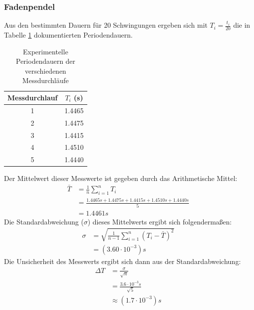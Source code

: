 \documentclass{report}
\begin{document}
\subsubsection{Fadenpendel}
Aus den bestimmten Dauern für 20 Schwingungen ergeben sich mit $T_i = \frac{t_i}{20}$ die in Tabelle \ref{tab:PeriodeMessdurchlaeufe} dokumentierten Periodendauern.
\begin{table}[H]
    \centering
    \caption{Experimentelle Periodendauern der verschiedenen Messdurchläufe}
    \label{tab:PeriodeMessdurchlaeufe}
    \begin{tabular}{c | c}
        \hline
        Messdurchlauf & $T_i$ (s) \\
        \hline
        1 & 1.4465\\
        2 & 1.4475\\
        3 & 1.4415\\
        4 & 1.4510\\
        5 & 1.4440\\
    \end{tabular}
\end{table}
\noindent
Der Mittelwert dieser Messwerte ist gegeben durch das Arithmetische Mittel:
\begin{equation}
    \begin{split}
        \bar{T} &= \frac{1}{n} \sum_{i=1}^{n} T_i \\
                &= \frac{1.4465s + 1.4475s + 1.4415s + 1.4510s + 1.4440s}{5} \\
                &= 1.4461s
    \end{split}
\end{equation}
Die Standardabweichung ($\sigma$) dieses Mittelwerts ergibt sich folgendermaßen:
\begin{equation}
    \begin{split}
        \sigma  &= \sqrt{\frac{1}{n-1}\sum_{i=1}^{n} (T_i - \bar{T})^2} \\
                &= (3.60 \cdot 10^{-3})s
    \end{split}
\end{equation}
Die Unsicherheit des Messwerts ergibt sich dann aus der Standardabweichung:
\begin{equation}
    \begin{split}
        \Delta T &= \frac{\sigma}{\sqrt{n}} \\
                 &= \frac{3.6 \cdot 10^{-3}s}{\sqrt{5}} \\
                 &\approx (1.7 \cdot 10^{-3})s
    \end{split}
\end{equation}
\end{document}
